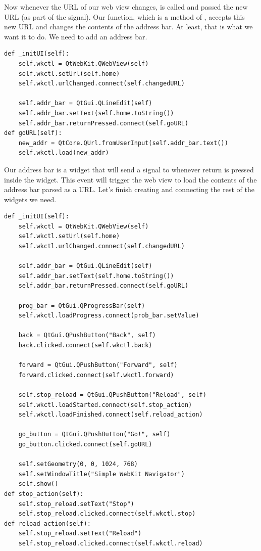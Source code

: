 Now whenever the URL of our web view changes,  is called and passed the new URL (as part of the signal).  Our function, which is a method of , accepts this new URL and changes the contents of the address bar.  At least, that is what we want it to do.  We need to add an address bar.
\begin{lstlisting}
def _initUI(self):
    self.wkctl = QtWebKit.QWebView(self)
    self.wkctl.setUrl(self.home)
    self.wkctl.urlChanged.connect(self.changedURL)
    
    self.addr_bar = QtGui.QLineEdit(self)
    self.addr_bar.setText(self.home.toString())
    self.addr_bar.returnPressed.connect(self.goURL)
def goURL(self):
    new_addr = QtCore.QUrl.fromUserInput(self.addr_bar.text())
    self.wkctl.load(new_addr)
\end{lstlisting}
Our address bar is a  widget that will send a signal to  whenever return is pressed inside the widget.  This event will trigger the web view to load the contents of the address bar parsed as a URL.
Let's finish creating and connecting the rest of the widgets we need.
\begin{lstlisting}
def _initUI(self):
    self.wkctl = QtWebKit.QWebView(self)
    self.wkctl.setUrl(self.home)
    self.wkctl.urlChanged.connect(self.changedURL)
    
    self.addr_bar = QtGui.QLineEdit(self)
    self.addr_bar.setText(self.home.toString())
    self.addr_bar.returnPressed.connect(self.goURL)
    
    prog_bar = QtGui.QProgressBar(self)
    self.wkctl.loadProgress.connect(prob_bar.setValue)
    
    back = QtGui.QPushButton("Back", self)
    back.clicked.connect(self.wkctl.back)
    
    forward = QtGui.QPushButton("Forward", self)
    forward.clicked.connect(self.wkctl.forward)
    
    self.stop_reload = QtGui.QPushButton("Reload", self)
    self.wkctl.loadStarted.connect(self.stop_action)
    self.wkctl.loadFinished.connect(self.reload_action)
    
    go_button = QtGui.QPushButton("Go!", self)
    go_button.clicked.connect(self.goURL)
    
    self.setGeometry(0, 0, 1024, 768)
    self.setWindowTitle("Simple WebKit Navigator")
    self.show()
def stop_action(self):
    self.stop_reload.setText("Stop")
    self.stop_reload.clicked.connect(self.wkctl.stop)
def reload_action(self):
    self.stop_reload.setText("Reload")
    self.stop_reload.clicked.connect(self.wkctl.reload)
\end{lstlisting}
